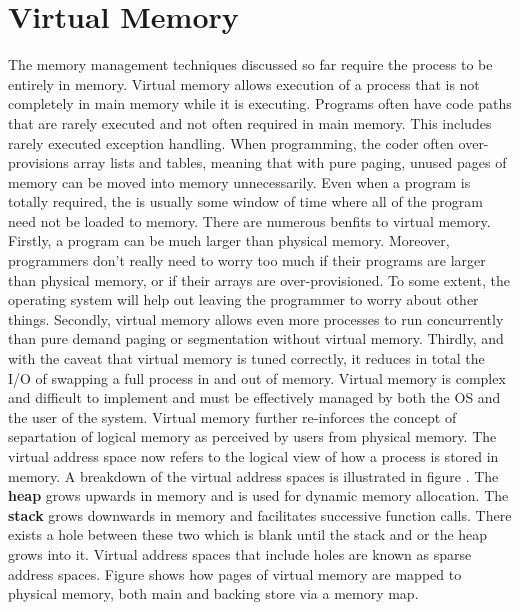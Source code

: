 \documentclass[10pt,a4paper]{article}
\begin{document}
\section{Virtual Memory}
The memory management techniques discussed so far require the process to be entirely in memory. Virtual memory allows execution of a process that is not completely in main memory while it is executing. Programs often have code paths that are rarely executed and not often required in main memory. This includes rarely executed exception handling. When programming, the coder often over-provisions array lists and tables, meaning that with pure paging, unused pages of memory can be moved into memory unnecessarily. Even when a program is totally required, the is usually some window of time where all of the program need not be loaded to memory.
\newline\newline
There are numerous benfits to virtual memory. Firstly, a program can be much larger than physical memory. Moreover, programmers don't really need to worry too much if their programs are larger than physical memory, or if their arrays are over-provisioned. To some extent, the operating system will help out leaving the programmer to worry about other things. Secondly, virtual memory allows even more processes to run concurrently than pure demand paging or segmentation without virtual memory. Thirdly, and with the caveat that virtual memory is tuned correctly, it reduces in total the I/O of swapping a full process in and out of memory. Virtual memory is complex and difficult to implement and must be effectively managed by both the OS and the user of the system. 
\newline\newline
Virtual memory further re-inforces the concept of separtation of logical memory as perceived by users from physical memory. The virtual address space now refers to the logical view of how a process is stored in memory. A breakdown of the virtual address spaces is illustrated in figure \cite{virtmem-log}. The {\bf heap} grows upwards in memory and is used for dynamic memory allocation. The {\bf stack} grows downwards in memory and facilitates successive function calls. There exists a hole between these two which is blank until the stack and or the heap grows into it. Virtual address spaces that include holes are known as sparse address spaces. Figure \cite{virtmem} shows how pages of virtual memory are mapped to physical memory, both main and backing store via a memory map.
\end{document}
